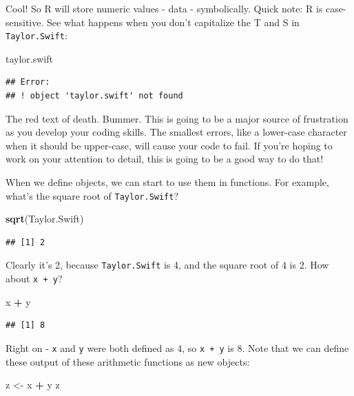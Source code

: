 \documentclass[
]{book}
\newenvironment{Shaded}{\begin{snugshade}}{\end{snugshade}}
\newcommand{\FunctionTok}[1]{\textcolor[rgb]{0.13,0.29,0.53}{\textbf{#1}}}
\newcommand{\NormalTok}[1]{#1}
\newcommand{\OtherTok}[1]{\textcolor[rgb]{0.56,0.35,0.01}{#1}}
\newcommand{\SpecialCharTok}[1]{\textcolor[rgb]{0.81,0.36,0.00}{\textbf{#1}}}
\begin{document}
Cool! So R will store numeric values - data - symbolically. Quick note: R is case-sensitive. See what happens when you don't capitalize the T and S in \texttt{Taylor.Swift}:

\begin{Shaded}
\begin{Highlighting}[]
\NormalTok{taylor.swift}
\end{Highlighting}
\end{Shaded}

\begin{verbatim}
## Error:
## ! object 'taylor.swift' not found
\end{verbatim}

The red text of death. Bummer. This is going to be a major source of frustration as you develop your coding skills. The smallest errors, like a lower-case character when it should be upper-case, will cause your code to fail. If you're hoping to work on your attention to detail, this is going to be a good way to do that!

When we define objects, we can start to use them in functions. For example, what's the square root of \texttt{Taylor.Swift}?

\begin{Shaded}
\begin{Highlighting}[]
\FunctionTok{sqrt}\NormalTok{(Taylor.Swift)}
\end{Highlighting}
\end{Shaded}

\begin{verbatim}
## [1] 2
\end{verbatim}

Clearly it's 2, because \texttt{Taylor.Swift} is 4, and the square root of 4 is 2. How about \texttt{x\ +\ y}?

\begin{Shaded}
\begin{Highlighting}[]
\NormalTok{x }\SpecialCharTok{+}\NormalTok{ y}
\end{Highlighting}
\end{Shaded}

\begin{verbatim}
## [1] 8
\end{verbatim}

Right on - \texttt{x} and \texttt{y} were both defined as 4, so \texttt{x\ +\ y} is 8. Note that we can define these output of these arithmetic functions as new objects:

\begin{Shaded}
\begin{Highlighting}[]
\NormalTok{z }\OtherTok{\textless{}{-}}\NormalTok{ x }\SpecialCharTok{+}\NormalTok{ y}
\NormalTok{z}
\end{Highlighting}
\end{Shaded}
\end{document}
